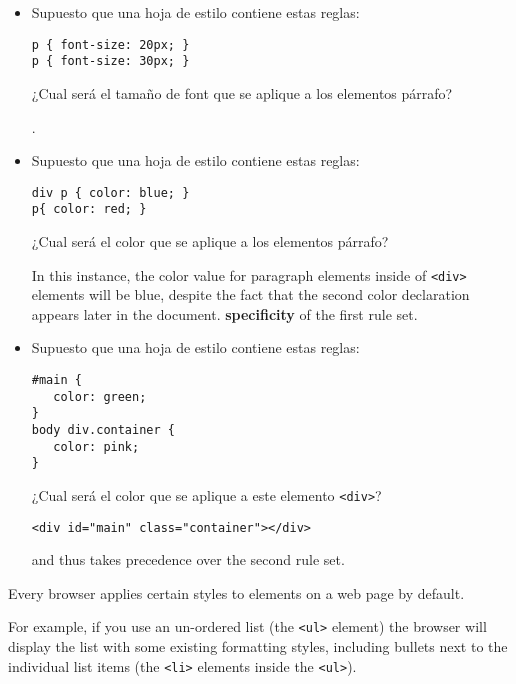 \begin{exercise}
\begin{itemize}
\item
Supuesto que una hoja de estilo contiene estas reglas:
\begin{verbatim}
p { font-size: 20px; }
p { font-size: 30px; } 
\end{verbatim}
¿Cual será el tamaño de font que se aplique a los elementos párrafo?

. 
\item
Supuesto que una hoja de estilo contiene estas reglas:
\begin{verbatim}
div p { color: blue; }
p{ color: red; }
\end{verbatim}
¿Cual será el color que se aplique a los elementos párrafo?

In this instance, the color value for paragraph elements inside of \verb|<div>|
elements will be blue, despite the fact that the second color declaration
appears later in the document.  {\bf specificity} of the first rule set.
\item
Supuesto que una hoja de estilo contiene estas reglas:
\begin{verbatim}
#main {
   color: green;
}
body div.container {
   color: pink;
}
\end{verbatim}
¿Cual será el color que se aplique a este elemento \verb|<div>|?
\begin{verbatim}
<div id="main" class="container"></div>
\end{verbatim}


and thus takes precedence over the second rule set.
\end{itemize}
\end{exercise}

Every browser applies certain styles to elements on a web page by default. 

For example, if you use an un-ordered list (the \verb|<ul>| element) the browser will display the list with some existing
formatting styles, including bullets next to the individual list items (the \verb|<li>| elements inside the \verb|<ul>|). 

